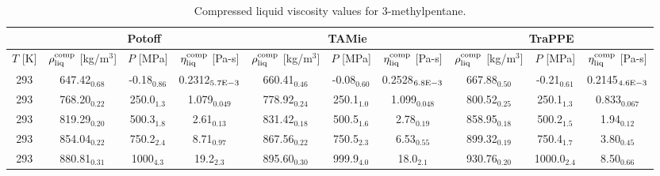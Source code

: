 \documentclass[preprint,review,12pt]{elsarticle}
\begin{document}
\begin{landscape}
	\begin{table}[H]
		\caption{Compressed liquid viscosity values for 3-methylpentane.}
		\begin{center}
			\begin{tabular}{|c|c|c|c|c|c|c|c|c|c|}
				\hline
				& \multicolumn{3}{c|}{Potoff}                                                                          & \multicolumn{3}{c|}{TAMie}                                                                              & \multicolumn{3}{c|}{TraPPE}                                                                          \\ \hline
				$T$ {[}K{]} & $\rho^{\rm comp}_{\rm liq}$ {[}kg/m$^3${]} & $P$ {[}MPa{]}  & $\eta^{\rm comp}_{\rm liq}$ {[}Pa-s{]} & $\rho^{\rm comp}_{\rm liq}$ {[}kg/m$^3${]} & $P$ {[}MPa{]}     & $\eta^{\rm comp}_{\rm liq}$ {[}Pa-s{]} & $\rho^{\rm comp}_{\rm liq}$ {[}kg/m$^3${]} & $P$ {[}MPa{]}  & $\eta^{\rm comp}_{\rm liq}$ {[}Pa-s{]} \\ \hline
				293         & 647.42$_{0.68}$                            & -0.18$_{0.86}$ & 0.2312$_{5.7 \rm E-3}$                      & 660.41$_{0.46}$                         & -0.08$_{0.60}$ & 0.2528$_{6.8 \rm E-3}$                      & 667.88$_{0.50}$                         & -0.21$_{0.61}$ & 0.2145$_{4.6 \rm E-3}$                      \\ \hline
				293         & 768.20$_{0.22}$                            & 250.0$_{1.3}$  & 1.079$_{0.049}$                        & 778.92$_{0.24}$                         & 250.1$_{1.0}$  & 1.099$_{0.048}$                        & 800.52$_{0.25}$                         & 250.1$_{1.3}$  & 0.833$_{0.067}$                        \\ \hline
				293         & 819.29$_{0.20}$                            & 500.3$_{1.8}$  & 2.61$_{0.13}$                          & 831.42$_{0.18}$                         & 500.5$_{1.6}$  & 2.78$_{0.19}$                          & 858.95$_{0.18}$                         & 500.2$_{1.5}$  & 1.94$_{0.12}$                          \\ \hline
				293         & 854.04$_{0.22}$                            & 750.2$_{2.4}$  & 8.71$_{0.97}$                          & 867.56$_{0.22}$                         & 750.5$_{2.3}$  & 6.53$_{0.55}$                          & 899.32$_{0.19}$                         & 750.4$_{1.7}$  & 3.80$_{0.45}$                          \\ \hline
				293         & 880.81$_{0.31}$                            & 1000$_{4.3}$   & 19.2$_{2.3}$                           & 895.60$_{0.30}$                         & 999.9$_{4.0}$  & 18.0$_{2.1}$                           & 930.76$_{0.20}$                         & 1000.0$_{2.4}$ & 8.50$_{0.66}$                          \\ \hline
			\end{tabular}
		\end{center}
	\end{table}



\end{landscape}
\end{document}
